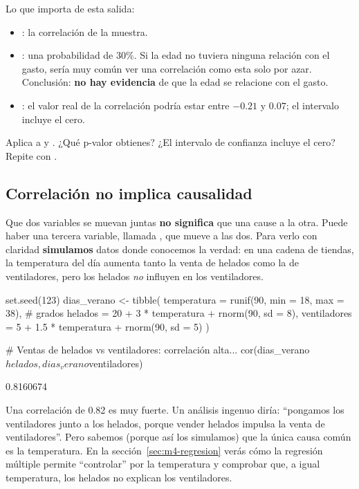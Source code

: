 Lo que importa de esta salida:
\begin{itemize}
  \item {}: la correlación de la muestra.
  \item {}: una probabilidad de 30\%. Si la edad no
        tuviera ninguna relación con el gasto, sería muy común ver una
        correlación como esta solo por azar. Conclusión: \textbf{no hay
        evidencia} de que la edad se relacione con el gasto.
  \item {}: el valor real de la
        correlación podría estar entre $-0.21$ y $0.07$; el intervalo
        incluye el cero.
\end{itemize}

\begin{hazlotu}
Aplica  a  y . ¿Qué
p-valor obtienes? ¿El intervalo de confianza incluye el cero? Repite con
.
\end{hazlotu}

\subsection{Correlación no implica causalidad}
\label{sec:m4-causalidad}

Que dos variables se muevan juntas \textbf{no significa} que una cause a la
otra. Puede haber una tercera variable, llamada , que mueve a las dos. Para verlo con claridad \textbf{simulamos}
datos donde conocemos la verdad: en una cadena de tiendas, la temperatura
del día aumenta tanto la venta de helados como la de ventiladores, pero los
helados \emph{no} influyen en los ventiladores.

\begin{rcode}
set.seed(123)
dias_verano <- tibble(
  temperatura = runif(90, min = 18, max = 38),           # grados
  helados     = 20 + 3 * temperatura + rnorm(90, sd = 8),
  ventiladores = 5 + 1.5 * temperatura + rnorm(90, sd = 5)
)

# Ventas de helados vs ventiladores: correlación alta...
cor(dias_verano$helados, dias_verano$ventiladores)
\end{rcode}
\begin{rsalida}
[1] 0.8160674
\end{rsalida}

Una correlación de 0.82 es muy fuerte. Un análisis ingenuo diría: ``pongamos
los ventiladores junto a los helados, porque vender helados impulsa la venta
de ventiladores''. Pero sabemos (porque así los simulamos) que la única causa
común es la temperatura. En la sección~\ref{sec:m4-regresion} verás cómo la
regresión múltiple permite ``controlar'' por la temperatura y comprobar que,
a igual temperatura, los helados no explican los ventiladores.

